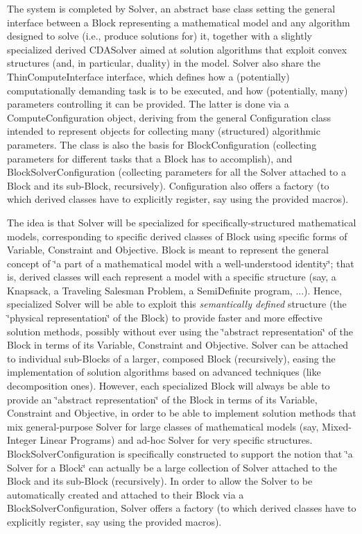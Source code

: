The system is completed by Solver, an abstract base class setting the general interface between a Block representing a mathematical model and any algorithm designed to solve (i.\+e., produce solutions for) it, together with a slightly specialized derived C\+D\+A\+Solver aimed at solution algorithms that exploit convex structures (and, in particular, duality) in the model. Solver also share the Thin\+Compute\+Interface interface, which defines how a (potentially) computationally demanding task is to be executed, and how (potentially, many) parameters controlling it can be provided. The latter is done via a Compute\+Configuration object, deriving from the general Configuration class intended to represent objects for collecting many (structured) algorithmic parameters. The class is also the basis for Block\+Configuration (collecting parameters for different tasks that a Block has to accomplish), and Block\+Solver\+Configuration (collecting parameters for all the Solver attached to a Block and its sub-\/\+Block, recursively). Configuration also offers a factory (to which derived classes have to explicitly register, say using the provided macros).

The idea is that Solver will be specialized for specifically-\/structured mathematical models, corresponding to specific derived classes of Block using specific forms of Variable, Constraint and Objective. Block is meant to represent the general concept of \char`\"{}a part of a mathematical model with a
well-\/understood identity\char`\"{}; that is, derived classes will each represent a model with a specific structure (say, a Knapsack, a Traveling Salesman Problem, a Semi\+Definite program, ...). Hence, specialized Solver will be able to exploit this {\itshape semantically defined} structure (the \char`\"{}physical
representation\char`\"{} of the Block) to provide faster and more effective solution methods, possibly without ever using the \char`\"{}abstract representation\char`\"{} of the Block in terms of its Variable, Constraint and Objective. Solver can be attached to individual sub-\/\+Blocks of a larger, composed Block (recursively), easing the implementation of solution algorithms based on advanced techniques (like decomposition ones). However, each specialized Block will always be able to provide an \char`\"{}abstract representation\char`\"{} of the Block in terms of its Variable, Constraint and Objective, in order to be able to implement solution methods that mix general-\/purpose Solver for large classes of mathematical models (say, Mixed-\/\+Integer Linear Programs) and ad-\/hoc Solver for very specific structures. Block\+Solver\+Configuration is specifically constructed to support the notion that \char`\"{}a Solver for a Block\char`\"{} can actually be a large collection of Solver attached to the Block and its sub-\/\+Block (recursively). In order to allow the Solver to be automatically created and attached to their Block via a Block\+Solver\+Configuration, Solver offers a factory (to which derived classes have to explicitly register, say using the provided macros).


